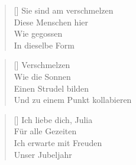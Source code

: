 \documentclass[twocolumn]{article}
\newenvironment{Strophe}{\begin{minipage}{\versewidth} \begin{verse}[\versewidth]}{\end{verse} \end{minipage}\vspace{0.05cm}}
\begin{document}
	\begin{Strophe}	
		Sie sind am verschmelzen \\
		Diese Menschen hier \\
		Wie gegossen \\
		In dieselbe Form \\
	\end{Strophe}
	
	\begin{Strophe}
		Verschmelzen \\
		Wie die Sonnen \\
		Einen Strudel bilden \\
		Und zu einem Punkt kollabieren \\
	\end{Strophe}
	
	\begin{Strophe}
		Ich liebe dich, Julia \\
		Für alle Gezeiten \\
		Ich erwarte mit Freuden \\
		Unser Jubeljahr \\
	\end{Strophe}
\end{document}
